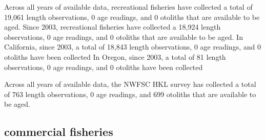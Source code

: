 \documentclass[11pt,
  english,
  letterpaper,
]{article}
\begin{document}
\leavevmode\tagmcend\tagstructend\par


Across all years of available data, recreational fisheries have collected a total of 19,061 length observations, 0 age readings, and 0 otoliths that are available to be aged. Since 2003, recreational fisheries have collected a 18,924 length observations, 0 age readings, and 0 otoliths that are available to be aged. In California, since 2003, a total of 18,843 length observations, 0 age readings, and 0 otoliths have been collected In Oregon, since 2003, a total of 81 length observations, 0 age readings, and 0 otoliths have been collected

\leavevmode\tagmcend\tagstructend\par


Across all years of available data, the NWFSC HKL survey has collected a total of 763 length observations, 0 age readings, and 699 otoliths that are available to be aged.

\leavevmode\tagmcend\tagstructend\par


\hypertarget{commercial-fisheries-42}{%
\subsection{commercial fisheries}\label{commercial-fisheries-42}}

\leavevmode\tagmcend\tagstructend


\begingroup\fontsize{10}{12}\selectfont \begingroup\fontsize{10}{12}\selectfont

\leavevmode\tagmcend\tagstructend\par
\end{document}
